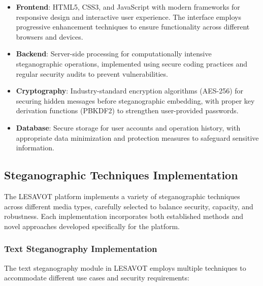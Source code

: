 \documentclass[12pt, a4paper, oneside]{book}
\begin{document}
\begin{itemize}[leftmargin=*]
    \item \textbf{Frontend}: HTML5, CSS3, and JavaScript with modern frameworks for responsive design and interactive user experience. The interface employs progressive enhancement techniques to ensure functionality across different browsers and devices.

    \item \textbf{Backend}: Server-side processing for computationally intensive steganographic operations, implemented using secure coding practices and regular security audits to prevent vulnerabilities.

    \item \textbf{Cryptography}: Industry-standard encryption algorithms (AES-256) for securing hidden messages before steganographic embedding, with proper key derivation functions (PBKDF2) to strengthen user-provided passwords.

    \item \textbf{Database}: Secure storage for user accounts and operation history, with appropriate data minimization and protection measures to safeguard sensitive information.
\end{itemize}

\subsection{Steganographic Techniques Implementation}
The LESAVOT platform implements a variety of steganographic techniques across different media types, carefully selected to balance security, capacity, and robustness. Each implementation incorporates both established methods and novel approaches developed specifically for the platform.

\subsubsection{Text Steganography Implementation}
The text steganography module in LESAVOT employs multiple techniques to accommodate different use cases and security requirements:
\end{document}
